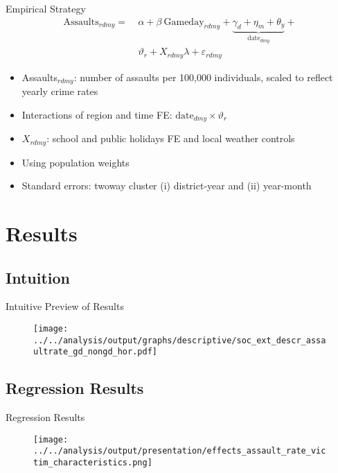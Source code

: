 \documentclass[usenames,dvipsnames]{beamer} %
\begin{document}
	\begin{frame}{Empirical Strategy}
		\begin{align}
			\text{Assaults}_{rdmy} =\ &\alpha + \beta\ \text{Gameday}_{rdmy} + \underbrace{\gamma_d +  \eta_m + \theta_y}_{\text{date}_{dmy}} + \nonumber\\ & \vartheta_r + X_{rdmy} \lambda + \varepsilon_{rdmy}
			\label{eq_soc_ext:model}
		\end{align}
	
		\begin{itemize}
			\item Assaults$_{rdmy}$: number of assaults per 100,000 individuals, scaled to reflect yearly crime rates
			\item Interactions of region and time FE: $\text{date}_{dmy}\times\vartheta_r$
			\item $ X_{rdmy}$: school and public holidays FE and local weather controls
			\item Using population weights
			\item Standard errors: twoway cluster (i) district-year and (ii) year-month
		\end{itemize}
	\end{frame}


	
\section{Results}
\subsection{Intuition}
	\begin{frame}{Intuitive Preview of Results}
		\begin{figure}
			\texttt{[image: ../../analysis/output/graphs/descriptive/soc\_ext\_descr\_assaultrate\_gd\_nongd\_hor.pdf]}
		\end{figure}
	\end{frame}



	\subsection{Regression Results}
	\begin{frame}{Regression Results}\label{link_regression_victim_characteristic}
		\begin{figure}
			\texttt{[image: ../../analysis/output/presentation/effects\_assault\_rate\_victim\_characteristics.png]}
		\end{figure}
		\hyperlink{link_regression_baseline}{} \hyperlink{link_regression_lead_lags}{} \hyperlink{link_regression_crime_characteristics}{}
	\end{frame}
\end{document}
